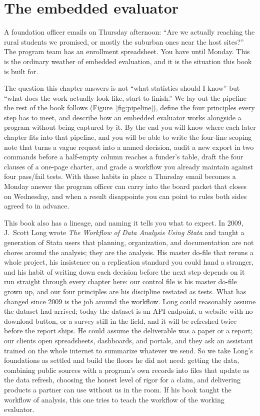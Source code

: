 \documentclass[
    a4paper,
    fontsize=10pt,
    twoside=true,
    numbers=noenddot,
]{kaobook}
\begin{document}
\chapter{The embedded evaluator}\label{ch:embedded}

A foundation officer emails on Thursday afternoon: \enquote{Are we actually reaching the rural students we promised, or mostly the suburban ones near the host sites?} The program team has an enrollment spreadsheet. You have until Monday. This is the ordinary weather of embedded evaluation, and it is the situation this book is built for.

The question this chapter answers is not \enquote{what statistics should I know} but \enquote{what does the work actually look like, start to finish.} We lay out the pipeline the rest of the book follows (Figure~\ref{fig:pipeline}), define the four principles every step has to meet, and describe how an embedded evaluator works alongside a program without being captured by it. By the end you will know where each later chapter fits into that pipeline, and you will be able to write the four-line scoping note that turns a vague request into a named decision, audit a new export in two commands before a half-empty column reaches a funder's table, draft the four clauses of a one-page charter, and grade a workflow you already maintain against four pass\slash fail tests. With those habits in place a Thursday email becomes a Monday answer the program officer can carry into the board packet that closes on Wednesday, and when a result disappoints you can point to rules both sides agreed to in advance.

This book also has a lineage, and naming it tells you what to expect. In 2009, J.\ Scott Long wrote \emph{The Workflow of Data Analysis Using Stata} \parencite{long2009workflow} and taught a generation of Stata users that planning, organization, and documentation are not chores around the analysis; they are the analysis. His master do-file that reruns a whole project, his insistence on a replication standard you could hand a stranger, and his habit of writing down each decision before the next step depends on it run straight through every chapter here: our control file is his master do-file grown up, and our four principles are his discipline restated as tests. What has changed since 2009 is the job around the workflow. Long could reasonably assume the dataset had arrived; today the dataset is an API endpoint, a website with no download button, or a survey still in the field, and it will be refreshed twice before the report ships. He could assume the deliverable was a paper or a report; our clients open spreadsheets, dashboards, and portals, and they ask an assistant trained on the whole internet to summarize whatever we send. So we take Long's foundations as settled and build the floors he did not need: getting the data, combining public sources with a program's own records into files that update as the data refresh, choosing the honest level of rigor for a claim, and delivering products a partner can use without us in the room. If his book taught the workflow of analysis, this one tries to teach the workflow of the working evaluator.
\end{document}
